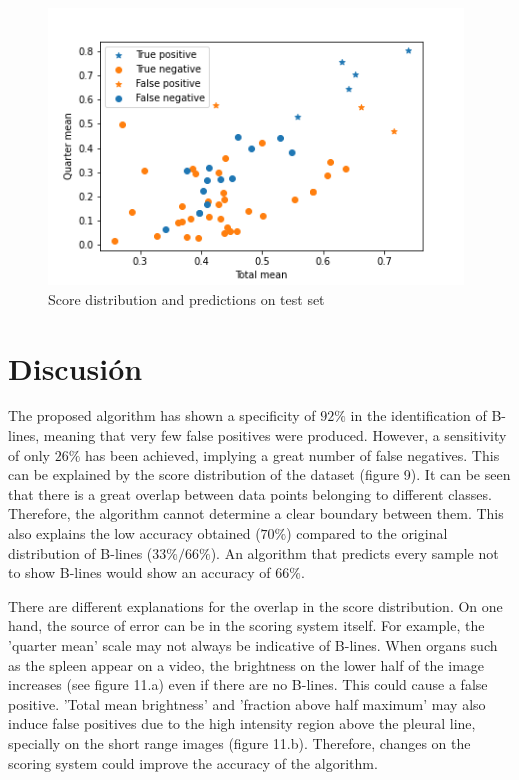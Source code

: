 \documentclass[11pt]{article} %
\begin{document}
	\begin{figure}[h]
	\centering
	\includegraphics[width=11cm]{figuras/discussion.png}
	\caption{Score distribution and predictions on test set}
	\end{figure}	

\section{Discusión}

	The proposed algorithm has shown a specificity of $92 \%$ in the identification of B-lines, meaning that very few false positives were produced. However, a sensitivity of only $26 \%$ has been achieved, implying a great number of false negatives.  This can be explained by the score distribution of the dataset (figure 9). It can be seen that there is a great overlap between data points belonging to different classes. Therefore, the algorithm cannot determine a clear boundary between them. This also explains the low accuracy obtained ($70\%$) compared to the original distribution of B-lines ($ 33\% / 66\%$). An algorithm that predicts every sample not to show B-lines would show an accuracy of $66\%$.
	
	
	There are different explanations for the overlap in the score distribution. On one hand, the source of error can be in the scoring system itself. For example, the 'quarter mean' scale may not always be indicative of B-lines. When organs such as the spleen appear on a video, the brightness on the lower half of the image increases (see figure 11.a) even if there are no B-lines. This could cause a false positive. 'Total mean brightness' and 'fraction above half maximum' may also induce false positives due to the high intensity region above the pleural line, specially on the short range images (figure 11.b). Therefore, changes on the scoring system could improve the accuracy of the algorithm.
	
\end{document}
